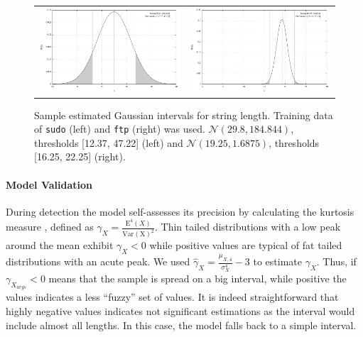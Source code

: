 \begin{figure}[t]
  \hspace*{-0.3cm}
  \begin{tabular}{lr}
    \includegraphics[width=.48\textwidth]{figures/host/improving/args_normal} &
    \includegraphics[width=.48\textwidth]{figures/host/improving/args_normal_1}
  \end{tabular}
  \caption[Sample estimated Gaussian intervals for string length.]{Sample estimated Gaussian intervals for string length. Training data of \texttt{sudo} (left) and \texttt{ftp} (right) was used. $\mathcal{N}(29.8, 184.844)$, thresholds [12.37, 47.22] (left) and $\mathcal{N}(19.25, 1.6875)$, thresholds [16.25, 22.25] (right).}
  \label{fig:args_distribution_normal}
\end{figure}

\paragraph{Model Validation} During detection the model self-assesses its precision by calculating the kurtosis measure \citep{joanes1998cms}, defined as $\gamma_{X} = \frac{\mathrm{E}^{4}(X)}{\mathrm{\mathrm{Var}(X)^{2}}}$. Thin tailed distributions with a low peak around the mean exhibit $\gamma_{X} < 0$ while positive values are typical of fat tailed distributions with an acute peak. We used $\hat{\gamma}_{X} = \frac{\mu_{X,4}}{\sigma^{4}_{X}} - 3$ to estimate $\gamma_{X}$. Thus, if $\gamma_{X_{args}} < 0$ means that the sample is spread on a big interval, while positive the values indicates a less ``fuzzy'' set of values. It is indeed straightforward that highly negative values indicates not significant estimations as the interval would include almost all lengths. In this case, the model falls back to a simple interval.

